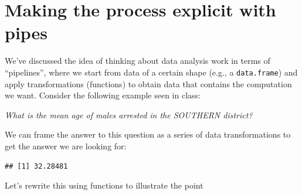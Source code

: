 \documentclass[]{book}
\newenvironment{Shaded}{\begin{snugshade}}{\end{snugshade}}
\newcommand{\KeywordTok}[1]{\textcolor[rgb]{0.13,0.29,0.53}{\textbf{#1}}}
\newcommand{\DataTypeTok}[1]{\textcolor[rgb]{0.13,0.29,0.53}{#1}}
\newcommand{\StringTok}[1]{\textcolor[rgb]{0.31,0.60,0.02}{#1}}
\newcommand{\CommentTok}[1]{\textcolor[rgb]{0.56,0.35,0.01}{\textit{#1}}}
\newcommand{\OtherTok}[1]{\textcolor[rgb]{0.56,0.35,0.01}{#1}}
\newcommand{\ControlFlowTok}[1]{\textcolor[rgb]{0.13,0.29,0.53}{\textbf{#1}}}
\newcommand{\OperatorTok}[1]{\textcolor[rgb]{0.81,0.36,0.00}{\textbf{#1}}}
\newcommand{\NormalTok}[1]{#1}
\theoremstyle{definition}
\theoremstyle{definition}
\theoremstyle{remark}
\begin{document}
\section{Making the process explicit with
pipes}\label{making-the-process-explicit-with-pipes}

We've discussed the idea of thinking about data analysis work in terms
of ``pipelines'', where we start from data of a certain shape (e.g., a
\texttt{data.frame}) and apply transformations (functions) to obtain
data that contains the computation we want. Consider the following
example seen in class:

\emph{What is the mean age of males arrested in the SOUTHERN district?}

We can frame the answer to this question as a series of data
transformations to get the answer we are looking for:

\begin{Shaded}
\end{Shaded}

\begin{verbatim}
## [1] 32.28481
\end{verbatim}

Let's rewrite this using functions to illustrate the point

\begin{Shaded}
\end{Shaded}
\end{document}
